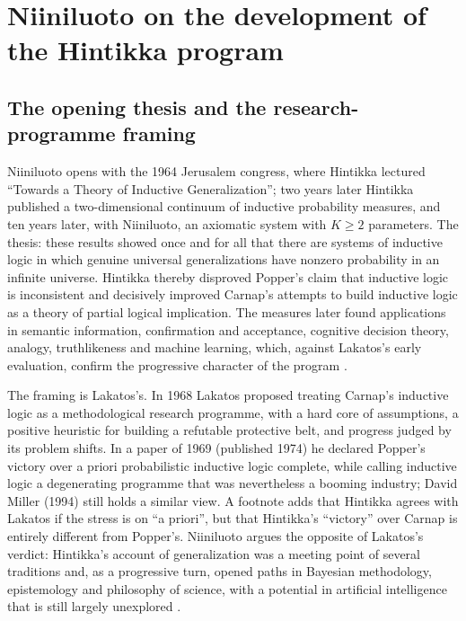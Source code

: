 \section{Niiniluoto on the development of the Hintikka program}
\label{sec:p15-w02b-p15-030-nn}

\subsection{The opening thesis and the research-programme framing}
\label{sec:p15-w02b-p15-030-nn-thesis}

Niiniluoto opens with the 1964 Jerusalem congress, where Hintikka
lectured ``Towards a Theory of Inductive Generalization''; two years
later Hintikka published a two-dimensional continuum of inductive
probability measures, and ten years later, with Niiniluoto, an axiomatic
system with \(K\geq2\) parameters. The thesis: these results showed once
and for all that there are systems of inductive logic in which genuine
universal generalizations have nonzero probability in an infinite
universe. Hintikka thereby disproved Popper's claim that inductive logic
is inconsistent and decisively improved Carnap's attempts to build
inductive logic as a theory of partial logical implication. The measures
later found applications in semantic information, confirmation and
acceptance, cognitive decision theory, analogy, truthlikeness and machine
learning, which, against Lakatos's early evaluation, confirm the
progressive character of the program
\cite[p.~311]{Niiniluoto2011HintikkaProgramReading}.

The framing is Lakatos's. In 1968 Lakatos proposed treating Carnap's
inductive logic as a methodological research programme, with a hard core
of assumptions, a positive heuristic for building a refutable protective
belt, and progress judged by its problem shifts. In a paper of 1969
(published 1974) he declared Popper's victory over a priori probabilistic
inductive logic complete, while calling inductive logic a degenerating
programme that was nevertheless a booming industry; David Miller (1994)
still holds a similar view. A footnote adds that Hintikka agrees with
Lakatos if the stress is on ``a priori'', but that Hintikka's
``victory'' over Carnap is entirely different from Popper's. Niiniluoto
argues the opposite of Lakatos's verdict: Hintikka's account of
generalization was a meeting point of several traditions and, as a
progressive turn, opened paths in Bayesian methodology, epistemology and
philosophy of science, with a potential in artificial intelligence that
is still largely unexplored
\cite[pp.~311--312 and n.~1]{Niiniluoto2011HintikkaProgramReading}.

